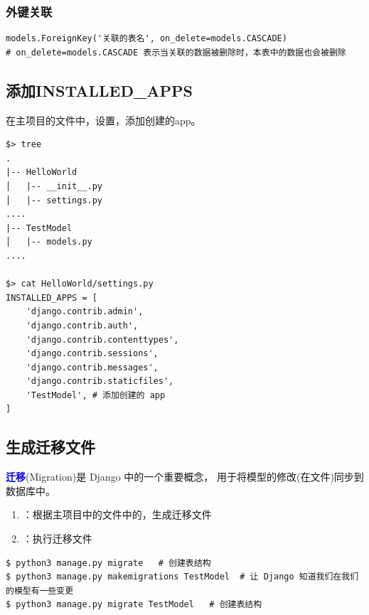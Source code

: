 \subsubsection{外键关联}
\begin{lstlisting}[style=demostyle,numbers=none]
models.ForeignKey('关联的表名', on_delete=models.CASCADE)
# on_delete=models.CASCADE 表示当关联的数据被删除时，本表中的数据也会被删除
\end{lstlisting}

\subsection{添加INSTALLED\_APPS}
在主项目的文件中，设置，添加创建的app。
\begin{lstlisting}[style=demostyle,numbers=none]
$> tree
.
|-- HelloWorld
│   |-- __init__.py
│   |-- settings.py
....
|-- TestModel
│   |-- models.py
....

$> cat HelloWorld/settings.py
INSTALLED_APPS = [
    'django.contrib.admin',
    'django.contrib.auth',
    'django.contrib.contenttypes',
    'django.contrib.sessions',
    'django.contrib.messages',
    'django.contrib.staticfiles',
    'TestModel', # 添加创建的 app
]
\end{lstlisting}

\subsection{生成迁移文件}
\textcolor{blue}{\textbf{迁移}}(Migration)是 Django 中的一个重要概念，
用于将模型的修改(在文件)同步到数据库中。

\begin{enumerate}[label=\arabic*)]
    \item {}：根据\textcolor{YBXPurple}{主项目}中的文件中的，生成迁移文件
    \item {}：执行迁移文件
\end{enumerate}

\begin{lstlisting}[style=demostyle,numbers=none]
$ python3 manage.py migrate   # 创建表结构
$ python3 manage.py makemigrations TestModel  # 让 Django 知道我们在我们的模型有一些变更
$ python3 manage.py migrate TestModel   # 创建表结构
\end{lstlisting}

